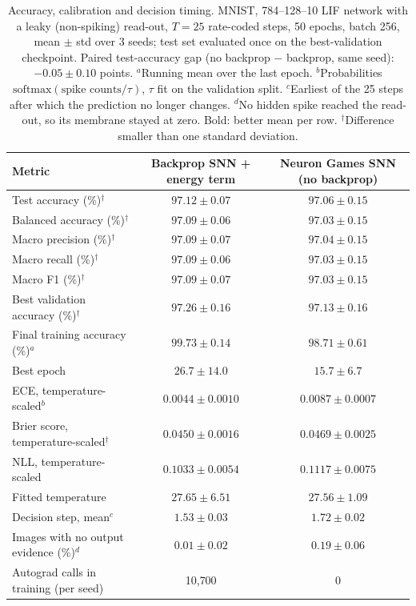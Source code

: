 \documentclass{article}
\begin{document}
\begin{table}[H]
\centering
\small
\caption{Accuracy, calibration and decision timing. MNIST, 784--128--10 LIF network with a leaky (non-spiking) read-out, $T=25$ rate-coded steps, 50 epochs, batch 256, mean $\pm$ std over 3 seeds; test set evaluated once on the best-validation checkpoint. Paired test-accuracy gap (no backprop $-$ backprop, same seed): $-0.05 \pm 0.10$ points. $^a$Running mean over the last epoch. $^b$Probabilities $\mathrm{softmax}(\text{spike counts}/\tau)$, $\tau$ fit on the validation split. $^c$Earliest of the 25 steps after which the prediction no longer changes. $^d$No hidden spike reached the read-out, so its membrane stayed at zero. Bold: better mean per row. $^\dagger$Difference smaller than one standard deviation.}
\label{tab:t2-accuracy}
\begin{tabular}{lcc}
\toprule
Metric & Backprop SNN + energy term & Neuron Games SNN (no backprop) \\
\midrule
Test accuracy (\%)$^\dagger$ & $\boldsymbol{97.12 \pm 0.07}$ & $97.06 \pm 0.15$ \\
Balanced accuracy (\%)$^\dagger$ & $\boldsymbol{97.09 \pm 0.06}$ & $97.03 \pm 0.15$ \\
Macro precision (\%)$^\dagger$ & $\boldsymbol{97.09 \pm 0.07}$ & $97.04 \pm 0.15$ \\
Macro recall (\%)$^\dagger$ & $\boldsymbol{97.09 \pm 0.06}$ & $97.03 \pm 0.15$ \\
Macro F1 (\%)$^\dagger$ & $\boldsymbol{97.09 \pm 0.07}$ & $97.03 \pm 0.15$ \\
Best validation accuracy (\%)$^\dagger$ & $\boldsymbol{97.26 \pm 0.16}$ & $97.13 \pm 0.16$ \\
Final training accuracy (\%)$^a$ & $99.73 \pm 0.14$ & $98.71 \pm 0.61$ \\
Best epoch & $26.7 \pm 14.0$ & $15.7 \pm 6.7$ \\
\midrule
ECE, temperature-scaled$^b$ & $\boldsymbol{0.0044 \pm 0.0010}$ & $0.0087 \pm 0.0007$ \\
Brier score, temperature-scaled$^\dagger$ & $\boldsymbol{0.0450 \pm 0.0016}$ & $0.0469 \pm 0.0025$ \\
NLL, temperature-scaled & $\boldsymbol{0.1033 \pm 0.0054}$ & $0.1117 \pm 0.0075$ \\
Fitted temperature & $27.65 \pm 6.51$ & $27.56 \pm 1.09$ \\
\midrule
Decision step, mean$^c$ & $\boldsymbol{1.53 \pm 0.03}$ & $1.72 \pm 0.02$ \\
Images with no output evidence (\%)$^d$ & $\boldsymbol{0.01 \pm 0.02}$ & $0.19 \pm 0.06$ \\
Autograd calls in training (per seed) & 10{,}700 & 0 \\
\bottomrule
\end{tabular}
\end{table}
\end{document}
